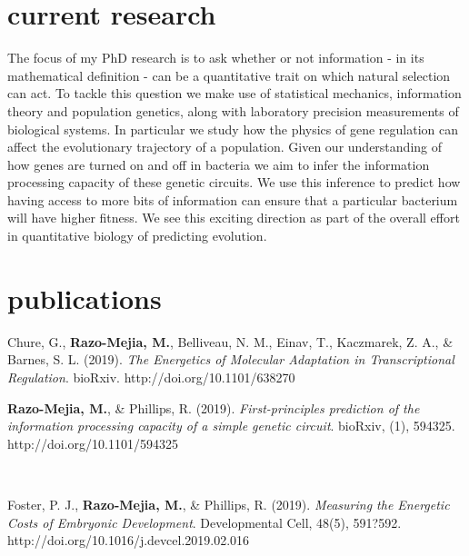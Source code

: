 \documentclass[]{friggeri-cv}
\begin{document}
\section{current research}

The focus of my PhD research is to ask whether or not information - in its mathematical definition - can be a quantitative trait on which natural selection can act. To tackle this question we make use of statistical mechanics, information theory and population genetics, along with laboratory precision measurements of biological systems. In particular we study how the physics of gene regulation can affect the evolutionary trajectory of a population. Given our understanding of how genes are turned on and off in bacteria we aim to infer the information processing capacity of these genetic circuits. We use this inference to predict how having access to more bits of information can ensure that a particular bacterium will have higher fitness. We see this exciting direction as part of the overall effort in quantitative biology of predicting evolution.

\section{publications}
\begin{flushleft}
Chure, G., \textbf{Razo-Mejia, M.}, Belliveau, N. M., Einav, T., Kaczmarek, Z. A., & Barnes, S. L. (2019). \textit{The Energetics of Molecular Adaptation in Transcriptional Regulation}. bioRxiv.\linebreak
http://doi.org/10.1101/638270\\
\end{flushleft}

\begin{flushleft}
\textbf{Razo-Mejia, M.}, & Phillips, R. (2019). \textit{First-principles prediction of the information processing capacity of a simple genetic circuit}. bioRxiv, (1), 594325.\linebreak
http://doi.org/10.1101/594325
\end{flushleft}\\

\begin{flushleft}
Foster, P. J., \textbf{Razo-Mejia, M.}, & Phillips, R. (2019). \textit{Measuring the Energetic Costs of Embryonic Development}. Developmental Cell, 48(5), 591?592.\linebreak
http://doi.org/10.1016/j.devcel.2019.02.016
\end{flushleft}\\
\end{document}
